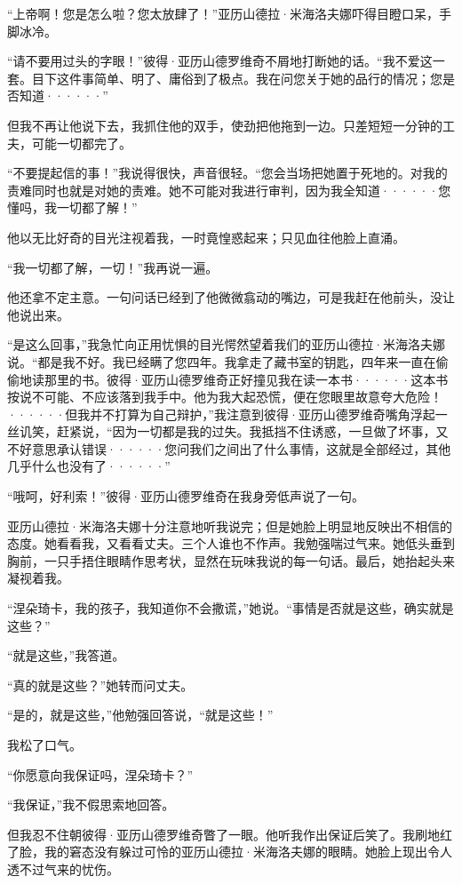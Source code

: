\documentclass[12pt, UTF8]{ctexbook}
\begin{document}
\par “上帝啊！您是怎么啦？您太放肆了！”亚历山德拉·米海洛夫娜吓得目瞪口呆，手脚冰冷。
\par “请不要用过头的字眼！”彼得·亚历山德罗维奇不屑地打断她的话。“我不爱这一套。目下这件事简单、明了、庸俗到了极点。我在问您关于她的品行的情况；您是否知道······”
\par 但我不再让他说下去，我抓住他的双手，使劲把他拖到一边。只差短短一分钟的工夫，可能一切都完了。
\par “不要提起信的事！”我说得很快，声音很轻。“您会当场把她置于死地的。对我的责难同时也就是对她的责难。她不可能对我进行审判，因为我全知道······您懂吗，我一切都了解！”
\par 他以无比好奇的目光注视着我，一时竟惶惑起来；只见血往他脸上直涌。
\par “我一切都了解，一切！”我再说一遍。
\par 他还拿不定主意。一句问话已经到了他微微翕动的嘴边，可是我赶在他前头，没让他说出来。
\par “是这么回事，”我急忙向正用忧惧的目光愕然望着我们的亚历山德拉·米海洛夫娜说。“都是我不好。我已经瞒了您四年。我拿走了藏书室的钥匙，四年来一直在偷偷地读那里的书。彼得·亚历山德罗维奇正好撞见我在读一本书······这本书按说不可能、不应该落到我手中。他为我大起恐慌，便在您眼里故意夸大危险！······但我并不打算为自己辩护，”我注意到彼得·亚历山德罗维奇嘴角浮起一丝讥笑，赶紧说，“因为一切都是我的过失。我抵挡不住诱惑，一旦做了坏事，又不好意思承认错误······您问我们之间出了什么事情，这就是全部经过，其他几乎什么也没有了······”
\par “哦呵，好利索！”彼得·亚历山德罗维奇在我身旁低声说了一句。
\par 亚历山德拉·米海洛夫娜十分注意地听我说完；但是她脸上明显地反映出不相信的态度。她看看我，又看看丈夫。三个人谁也不作声。我勉强喘过气来。她低头垂到胸前，一只手捂住眼睛作思考状，显然在玩味我说的每一句话。最后，她抬起头来凝视着我。
\par “涅朵琦卡，我的孩子，我知道你不会撒谎，”她说。“事情是否就是这些，确实就是这些？”
\par “就是这些，”我答道。
\par “真的就是这些？”她转而问丈夫。
\par “是的，就是这些，”他勉强回答说，“就是这些！”
\par 我松了口气。
\par “你愿意向我保证吗，涅朵琦卡？”
\par “我保证，”我不假思索地回答。
\par 但我忍不住朝彼得·亚历山德罗维奇瞥了一眼。他听我作出保证后笑了。我刷地红了脸，我的窘态没有躲过可怜的亚历山德拉·米海洛夫娜的眼睛。她脸上现出令人透不过气来的忧伤。
\end{document}
